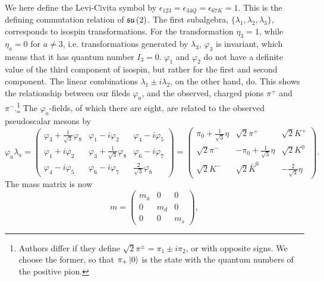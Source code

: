 %
We here define the Levi-Civita symbol by $\epsilon_{123} = \epsilon_{34Q} =\epsilon_{67K} = 1$.
This is the defining commutation relation of $\mathfrak{su}\left(2\right)$.
The first subalgebra, $\{ \lambda_1, \lambda_2, \lambda_3 \}$, corresponds to isospin transformations.
For the transformation $\eta_3 = 1$, while $\eta_a = 0$ for $a\neq 3$, i.e. transformations generated by $\lambda_3$, $\varphi_3$ is invariant, which means that it has quantum number $I_3 = 0$.
$\varphi_1$ and $\varphi_2$ do not have a definite value of the third component of isospin, but rather for the first and second component.
The linear combinations $\lambda_1 \pm i \lambda_2$, on the other hand, do.
This shows the relationship between our fileds $\varphi_a$, and the observed, charged pions $\pi^+$ and $\pi^-$.\footnote{
    Authors differ if they define $\sqrt 2 \pi^\pm = \pi_1 \pm i \pi_2$, or with opposite signs. We choose the former, so that $\pi_+ \ket{0}$ is the state with the quantum numbers of the positive pion.
    }
The $\varphi_a$-fields, of which there are eight, are related to the observed pseudoscalar mesons by~\autocite{schererIntroductionChiralPerturbation2002}
%
\begin{equation}
    \varphi_a \lambda_a
    =
    \begin{pmatrix}
        \varphi_3 + \frac{1}{\sqrt{3}} \varphi_8 & \varphi_1 - i \varphi_2 & \varphi_4 - i \varphi_5 \\
        \varphi_1 + i \varphi_2 & \varphi_3 + \frac{1}{\sqrt{3}} \varphi_8 & \varphi_6 - i \varphi_7  \\
        \varphi_4 - i \varphi_5 & \varphi_6 - i \varphi_7  & \frac{2}{\sqrt{3}} \varphi_8
    \end{pmatrix}
    =
    \begin{pmatrix}
        \pi_0 + \frac{1}{\sqrt{3}}\eta & \sqrt{2}\pi^+ & \sqrt{2}K^+ \\
        \sqrt{2}\pi^- & -\pi_0 + \frac{1}{\sqrt{3}}\eta & \sqrt{2}K^0 \\
        \sqrt{2}K^- & \sqrt{2}\bar K^0  & - \frac{2}{\sqrt 3} \eta
    \end{pmatrix}.
\end{equation}
%
The mass matrix is now
%
\begin{equation}
    m = 
    \begin{pmatrix}
        m_u & 0 & 0 \\
        0 & m_d & 0 \\
        0 & 0 & m_s
    \end{pmatrix},
\end{equation}
